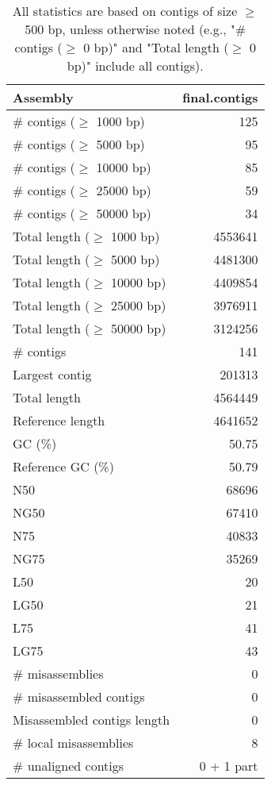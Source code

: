 \documentclass[12pt,a4paper]{article}
\begin{document}
\begin{table}[ht]
\begin{center}
\caption{All statistics are based on contigs of size $\geq$ 500 bp, unless otherwise noted (e.g., "\# contigs ($\geq$ 0 bp)" and "Total length ($\geq$ 0 bp)" include all contigs).}
\begin{tabular}{|l*{1}{|r}|}
\hline
Assembly & final.contigs \\ \hline
\# contigs ($\geq$ 1000 bp) & 125 \\ \hline
\# contigs ($\geq$ 5000 bp) & 95 \\ \hline
\# contigs ($\geq$ 10000 bp) & 85 \\ \hline
\# contigs ($\geq$ 25000 bp) & 59 \\ \hline
\# contigs ($\geq$ 50000 bp) & 34 \\ \hline
Total length ($\geq$ 1000 bp) & 4553641 \\ \hline
Total length ($\geq$ 5000 bp) & 4481300 \\ \hline
Total length ($\geq$ 10000 bp) & 4409854 \\ \hline
Total length ($\geq$ 25000 bp) & 3976911 \\ \hline
Total length ($\geq$ 50000 bp) & 3124256 \\ \hline
\# contigs & 141 \\ \hline
Largest contig & 201313 \\ \hline
Total length & 4564449 \\ \hline
Reference length & 4641652 \\ \hline
GC (\%) & 50.75 \\ \hline
Reference GC (\%) & 50.79 \\ \hline
N50 & 68696 \\ \hline
NG50 & 67410 \\ \hline
N75 & 40833 \\ \hline
NG75 & 35269 \\ \hline
L50 & 20 \\ \hline
LG50 & 21 \\ \hline
L75 & 41 \\ \hline
LG75 & 43 \\ \hline
\# misassemblies & 0 \\ \hline
\# misassembled contigs & 0 \\ \hline
Misassembled contigs length & 0 \\ \hline
\# local misassemblies & 8 \\ \hline
\# unaligned contigs & 0 + 1 part \\ \hline

\end{tabular}
\end{center}
\end{table}
\end{document}
